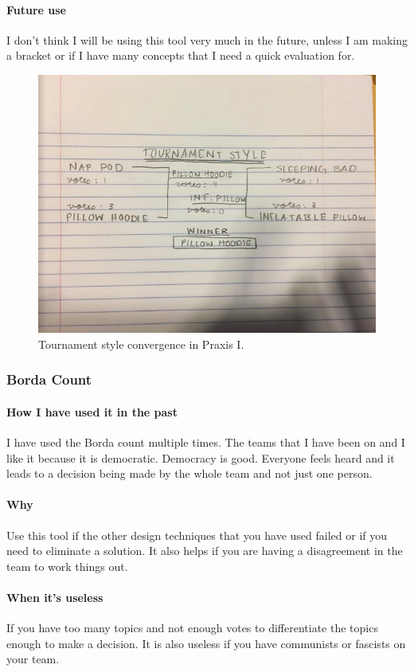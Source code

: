 \documentclass[paper=a4, fontsize=11pt]{article} %
\newcommand{\raisetarget}[2]%
{\bgroup
  \sbox0{#2}%
  \raisebox{\ht0}{\hypertarget{#1}{}}\usebox0%
\egroup}
\begin{document}
            \paragraph{Future use}
            I don't think I will be using this tool very much in the future, unless I am making a bracket or if I have many concepts that I need a quick evaluation for.
            \begin{figure}[H]
                \centering
	            \includegraphics[width=0.8\linewidth]{tournament.png}
	            \caption{Tournament style convergence in Praxis I.}
            \end{figure}
        \raisetarget{bordalink}{}
        \subsubsection{Borda Count}
            \paragraph{How I have used it in the past}
            \cite{borda} I have used the Borda count multiple times. The teams that I have been on and I like it because it is democratic. Democracy is good. Everyone feels heard and it leads to a decision being made by the whole team and not just one person.
            \paragraph{Why}
            Use this tool if the other design techniques that you have used failed or if you need to eliminate a solution. It also helps if you are having a disagreement in the team to work things out.
            \paragraph{When it's useless}
            If you have too many topics and not enough votes to differentiate the topics enough to make a decision. It is also useless if you have communists or fascists on your team.
\end{document}
